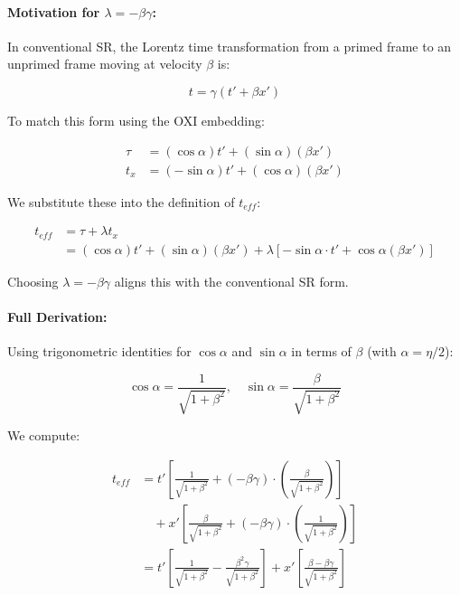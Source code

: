 \documentclass{article}
\begin{document}
\paragraph{Motivation for $\lambda = -\beta\gamma$:} In conventional SR, the Lorentz time transformation from a primed frame to an unprimed frame moving at velocity $\beta$ is:

\begin{equation}
t = \gamma (t' + \beta x')
\end{equation}

To match this form using the OXI embedding:

\begin{equation}
\begin{aligned}
\tau &= (\cos\alpha) t' + (\sin\alpha)(\beta x') \\
t_x &= (-\sin\alpha) t' + (\cos\alpha)(\beta x')
\end{aligned}
\end{equation}

We substitute these into the definition of $t_{eff}$:

\begin{equation}
\begin{aligned}
t_{eff} &= \tau + \lambda t_x \\
&= (\cos\alpha) t' + (\sin\alpha)(\beta x') + \lambda[-\sin\alpha \cdot t' + \cos\alpha (\beta x')]
\end{aligned}
\end{equation}

Choosing $\lambda = -\beta\gamma$ aligns this with the conventional SR form.

\paragraph{Full Derivation:} Using trigonometric identities for $\cos\alpha$ and $\sin\alpha$ in terms of $\beta$ (with $\alpha = \eta/2$):

\begin{equation}
\cos\alpha = \frac{1}{\sqrt{1 + \beta^2}}, \quad \sin\alpha = \frac{\beta}{\sqrt{1 + \beta^2}}
\end{equation}

We compute:

\begin{align*}
t_{eff} &= t'\left[\frac{1}{\sqrt{1 + \beta^2}} + \left(-\beta\gamma\right) \cdot \left(\frac{\beta}{\sqrt{1 + \beta^2}}\right)\right] \\
&\quad + x'\left[\frac{\beta}{\sqrt{1 + \beta^2}} + \left(-\beta\gamma\right) \cdot \left(\frac{1}{\sqrt{1 + \beta^2}}\right)\right] \\
&= t'\left[\frac{1}{\sqrt{1 + \beta^2}} - \frac{\beta^2\gamma}{\sqrt{1 + \beta^2}}\right] + x'\left[\frac{\beta - \beta\gamma}{\sqrt{1 + \beta^2}}\right]
\end{align*}
\end{document}
